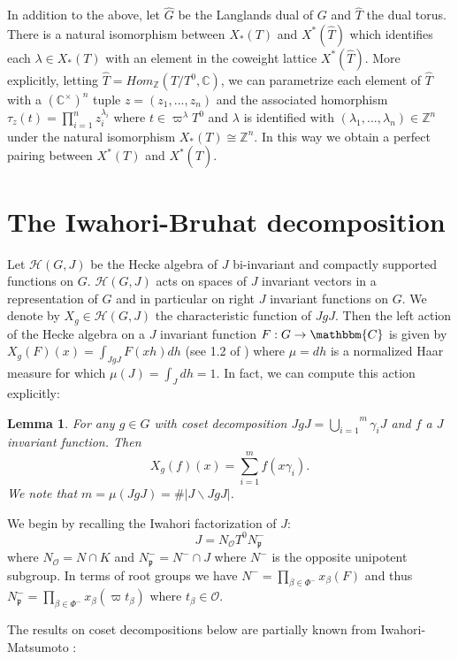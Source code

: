 \documentclass{article}
\newtheorem{lemma}{Lemma}
\begin{document}
 In addition to the above, let $\hat{G}$ be the Langlands dual of $G$ and $\hat{T}$ the dual torus. There is a natural isomorphism between $X_*(T)$ and $X^*(\hat{T})$ which identifies each $\lambda\in X_*(T)$ with an element in the coweight lattice $X^*(\hat{T})$. More explicitly, letting $\hat{T}=Hom_{\mathbb{Z}}(T/T^0,\mathbb{C})$, we can parametrize each element of $\hat{T}$ with a $(\mathbb{C}^{\times})^n$ tuple $z=(z_1,...,z_n)$ and the associated homorphism $\tau_z(t)=\prod\limits_{i=1}^nz_i^{\lambda_i}$ where $t\in\varpi^{\lambda}T^0$ and $\lambda$ is identified with $(\lambda_1,...,\lambda_n)\in\mathbb{Z}^n$ under the natural isomorphism $X_*(T)\cong \mathbb{Z}^n$. In this way we obtain a perfect pairing between $X^*(T)$ and $X^*(\hat{T})$.


\section{The Iwahori-Bruhat decomposition}


Let $\mathcal{H}(G,J)$ be the Hecke algebra of $J$ bi-invariant and compactly supported functions on $G$. $\mathcal{H}(G,J)$ acts on spaces of $J$ invariant vectors in a representation of $G$ and 
in particular on right $J$ invariant functions on $G$. We denote by
$X_g\in \mathcal{H}(G,J)$ the characteristic function of $JgJ$. Then the left action of the Hecke algebra on a $J$ invariant function $F:G\to\mathbbm{C}$ is given by $X_g(F)(x)=\int_{JgJ}F(xh)dh$ (see 1.2 of \cite{bor}) where $\mu=dh$ is a normalized Haar measure for which $\mu(J)=\int_Jdh=1$. 
In fact, we can compute this action explicitly:
\begin{lemma} \label{cosum1}
    For any $g\in G$ with coset decomposition $JgJ=\overset{m}{\underset{i=1}{\bigcup}}\gamma_iJ$ and $f$ a $J$ invariant function. Then $$X_{g}(f)(x)=\sum\limits_{i=1}^mf(x\gamma_i).$$ We note that $m=\mu(JgJ)=\#|J\backslash JgJ|$.
\end{lemma}

We begin by recalling the Iwahori factorization of $J$:
$$J=N_{\mathcal{O}}T^0N_{\mathfrak{p}}^-$$ where $N_{\mathcal{O}}=N\cap K$ and $N_{\mathfrak{p}}^-=N^-\cap J$ where $N^-$ is the opposite unipotent subgroup. In terms of root groups we have $N^-=\prod\limits_{\beta\in\Phi^-}x_{\beta}(F)$ and thus $N_{\mathfrak{p}}^-=\prod\limits_{\beta\in\Phi^-}x_{\beta}(\varpi t_{\beta})$ where $t_{\beta}\in\mathcal{O}$.

The results on coset decompositions below are partially known from Iwahori-Matsumoto \cite{iwmats}:
\end{document}
